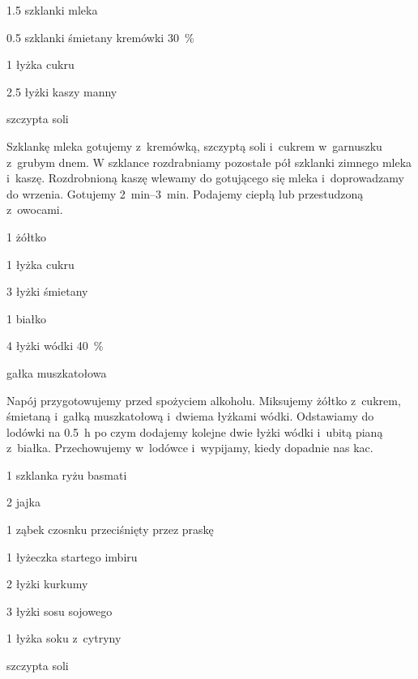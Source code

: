 \documentclass[../main.tex]{subfiles}
\begin{document}

\begin{Ingred}
    \item \num{1.5} szklanki mleka
    \item \num{0.5} szklanki śmietany kremówki \qty{30}{\percent}
    \item \num{1} łyżka cukru
    \item \num{2.5} łyżki kaszy manny
    \item szczypta soli
\end{Ingred}

Szklankę mleka gotujemy z~kremówką, szczyptą soli i~cukrem w~garnuszku z~grubym
dnem. W szklance rozdrabniamy pozostałe pół szklanki zimnego mleka i~kaszę.
Rozdrobnioną kaszę wlewamy do gotującego się mleka i~doprowadzamy do wrzenia.
Gotujemy \qtyrange{2}{3}{\minute}. Podajemy ciepłą lub przestudzoną z~owocami.


\begin{Ingred}
    \item \num{1} żółtko
    \item \num{1} łyżka cukru
    \item \num{3} łyżki śmietany
    \item \num{1} białko
    \item \num{4} łyżki wódki \qty{40}{\percent}
    \item gałka muszkatołowa
\end{Ingred}

Napój przygotowujemy przed spożyciem alkoholu. Miksujemy żółtko z~cukrem,
śmietaną i~gałką muszkatołową i~dwiema łyżkami wódki. Odstawiamy do lodówki na
\qty{0.5}{\hour} po czym dodajemy kolejne dwie łyżki wódki i~ubitą pianą
z~białka. Przechowujemy w~lodówce i~wypijamy, kiedy dopadnie nas kac.


\begin{Ingred}
    \item \num{1} szklanka ryżu basmati
    \item \num{2} jajka
    \item \num{1} ząbek czosnku przeciśnięty przez praskę
    \item \num{1} łyżeczka startego imbiru
    \item \num{2} łyżki kurkumy
    \item \num{3} łyżki sosu sojowego
    \item \num{1} łyżka soku z~cytryny
    \item szczypta soli
\end{Ingred}
\end{document}

